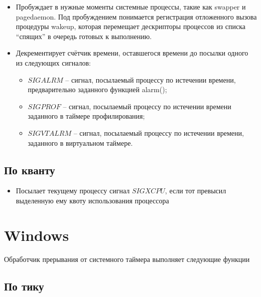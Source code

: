             \begin{itemize}
                \item Пробуждает в нужные моменты системные процессы, такие как swapper и pagedaemon. Под пробуждением понимается регистрация отложенного вызова процедуры wakeup, которая перемещает дескрипторы процессов из списка “спящих” в очередь готовых к выполнению.
                \item Декрементирует счётчик времени, оставшегося времени до посылки одного из следующих сигналов:
                \begin{itemize}
                    \item \(SIGALRM\) – сигнал, посылаемый процессу по истечении времени, предварительно заданного функцией alarm();
                    \item \(SIGPROF\) – сигнал, посылаемый процессу по истечении времени заданного в таймере профилирования;
                    \item \(SIGVTALRM\) – сигнал, посылаемый процессу по истечении времени, заданного в виртуальном таймере.
                \end{itemize}
            \end{itemize}
        
        \subsection{По кванту}
            \begin{itemize}
                \item Посылает текущему процессу сигнал \( SIGXCPU \), если тот превысил выделенную ему квоту использования процессора
            \end{itemize}
        
    \section{Windows}
    
        Обработчик прерывания от системного таймера выполняет следующие функции
    
        \subsection{По тику}
        
